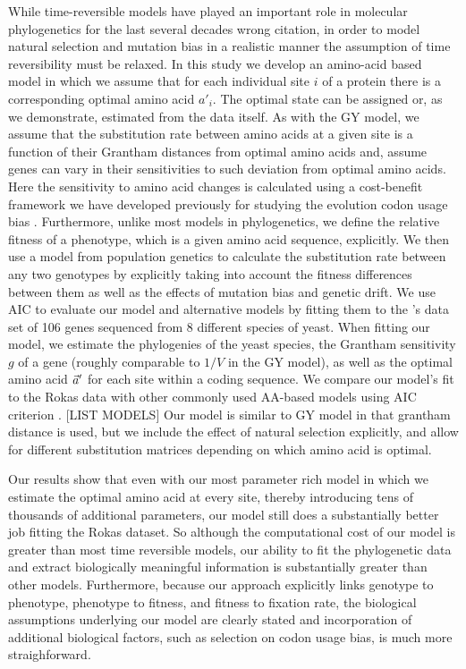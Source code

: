While time-reversible models have played an important role in molecular phylogenetics for the last several decades \citep{tavare1986} {\color{blue} wrong citation},  in order to model natural selection and mutation bias in a realistic manner the assumption of time reversibility must be relaxed.
In this study we develop an amino-acid based model in which we assume that for each individual site $i$ of a protein there is a corresponding optimal amino acid $a'_i$.
The optimal state can be assigned or, as we demonstrate, estimated from the data itself.
As with the GY model, we assume that the substitution rate between amino acids at a given site is a function of their Grantham distances from optimal amino acids and, assume genes can vary in their sensitivities to such deviation from optimal amino acids.
Here the sensitivity to amino acid changes is calculated using a cost-benefit framework we have developed previously for studying the evolution codon usage bias \citep{Gilchrist2007, gilchrist2009genetics,ShahGilchrist2011pnas}.
Furthermore, unlike most models in phylogenetics, we define the relative fitness of a phenotype, which is a given amino acid sequence, explicitly.
We then use a model from population genetics to calculate the substitution rate between any two genotypes by explicitly taking into account the fitness differences between them as well as the effects of mutation bias and genetic drift.
We use AIC to evaluate our model and alternative models by fitting them to the \citet{rokas2003nature}'s data set of 106 genes sequenced from 8 different species of yeast.
When fitting our model, we estimate the phylogenies of the yeast species, the Grantham sensitivity $g$ of a gene (roughly comparable to $1/V$ in the GY model), as well as the optimal amino acid $\vec{a}^\prime$ for each site within a coding sequence.
We compare our model's fit to the Rokas data with other commonly used AA-based models using AIC criterion \citep{akaike1973information, akaike1974new, akaike1981likelihood}. [LIST MODELS] Our model is similar to GY model in that grantham distance is used, but we include the effect of natural selection explicitly, and allow for different substitution matrices depending on which amino acid is optimal.

Our results show that even with our most parameter rich model in which we estimate the optimal amino acid at every site, thereby introducing tens of thousands of additional parameters, our model still does a substantially better job fitting the Rokas dataset.
So although the computational cost of our model is greater than most time reversible models,  our ability to fit the phylogenetic data and extract biologically meaningful information is substantially greater than other models.
Furthermore, because our approach explicitly links genotype to phenotype, phenotype to fitness, and fitness to fixation rate, the biological assumptions underlying our model are clearly stated and incorporation of additional biological factors, such as selection on codon usage bias, is much more straighforward.
 

